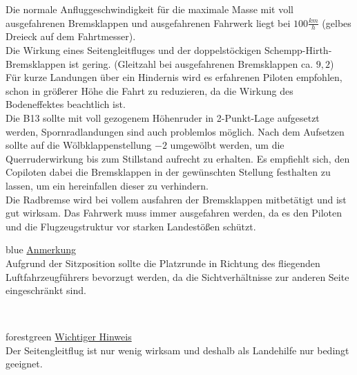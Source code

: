 Die normale Anfluggeschwindigkeit für die maximale Masse mit voll ausgefahrenen Bremsklappen und ausgefahrenen Fahrwerk liegt bei $100 \frac{km}{h}$ (gelbes Dreieck auf dem Fahrtmesser).\\
Die Wirkung eines Seitengleitfluges und der doppelstöckigen Schempp-Hirth-Bremsklappen ist gering. (Gleitzahl bei ausgefahrenen Bremsklappen ca. $9,2$) \\
Für kurze Landungen über ein Hindernis wird es erfahrenen Piloten empfohlen, schon in größerer Höhe die Fahrt zu reduzieren, da die Wirkung des Bodeneffektes beachtlich ist.\\
Die B13 sollte mit voll gezogenem Höhenruder in 2-Punkt-Lage aufgesetzt werden, Spornradlandungen sind auch problemlos möglich. Nach dem Aufsetzen sollte auf die Wölbklappenstellung $-2$ umgewölbt werden, um die Querruderwirkung bis zum Stillstand aufrecht zu erhalten. Es empfiehlt sich, den Copiloten dabei die Bremsklappen in der gewünschten Stellung festhalten zu lassen, um ein hereinfallen dieser zu verhindern. \\
Die Radbremse wird bei vollem ausfahren der Bremsklappen mitbetätigt und ist gut wirksam.
Das Fahrwerk muss immer ausgefahren werden, da es den Piloten und die Flugzeugstruktur vor starken Landestößen schützt.\\
\newline
\begin{color}{blue}
\large{\underline{Anmerkung}}\\
Aufgrund der Sitzposition sollte die Platzrunde in Richtung des fliegenden Luftfahrzeugführers bevorzugt werden, da die Sichtverhältnisse zur anderen Seite eingeschränkt sind.
\end{color}\\
\newline
\begin{color}{forestgreen}
\large{\underline{Wichtiger Hinweis}}\\
Der Seitengleitflug ist nur wenig wirksam und deshalb als Landehilfe nur bedingt geeignet.
\end{color}\\
